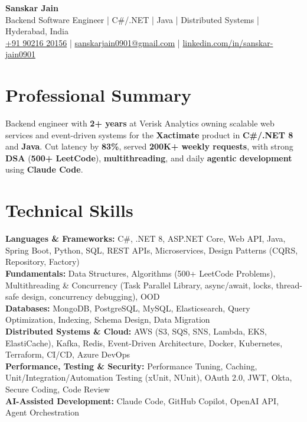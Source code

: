 \documentclass[letterpaper,10pt]{article}
\begin{document}
\begin{center}
    {\LARGE \textbf{Sanskar Jain}} \\
    Backend Software Engineer \;|\; C\#/.NET \;|\; Java \;|\; Distributed Systems \;|\; Hyderabad, India \\
    \href{tel:+919021620156}{+91 90216 20156} \;|\;
    \href{mailto:sanskarjain0901@gmail.com}{sanskarjain0901@gmail.com} \;|\;
    \href{https://www.linkedin.com/in/sanskar-jain0901/}{linkedin.com/in/sanskar-jain0901}
\end{center}

\section*{Professional Summary}
Backend engineer with \textbf{2+ years} at Verisk Analytics owning scalable web services and event-driven systems for the \textbf{Xactimate} product in \textbf{C\#/.NET 8} and \textbf{Java}. Cut latency by \textbf{83\%}, served \textbf{200K+ weekly requests}, with strong \textbf{DSA} (\textbf{500+ LeetCode}), \textbf{multithreading}, and daily \textbf{agentic development} using \textbf{Claude Code}.

\section*{Technical Skills}
\begin{sloppypar}
\noindent
\textbf{Languages \& Frameworks:} C\#, .NET 8, ASP.NET Core, Web API, Java, Spring Boot, Python, SQL, REST APIs, Microservices, Design Patterns (CQRS, Repository, Factory) \\
\textbf{Fundamentals:} Data Structures, Algorithms (500+ LeetCode Problems), Multithreading \& Concurrency (Task Parallel Library, async/await, locks, thread-safe design, concurrency debugging), OOD \\
\textbf{Databases:} MongoDB, PostgreSQL, MySQL, Elasticsearch, Query Optimization, Indexing, Schema Design, Data Migration \\
\textbf{Distributed Systems \& Cloud:} AWS (S3, SQS, SNS, Lambda, EKS, ElastiCache), Kafka, Redis, Event-Driven Architecture, Docker, Kubernetes, Terraform, CI/CD, Azure DevOps \\
\textbf{Performance, Testing \& Security:} Performance Tuning, Caching, Unit/Integration/Automation Testing (xUnit, NUnit), OAuth 2.0, JWT, Okta, Secure Coding, Code Review \\
\textbf{AI-Assisted Development:} Claude Code, GitHub Copilot, OpenAI API, Agent Orchestration
\end{sloppypar}
\end{document}
